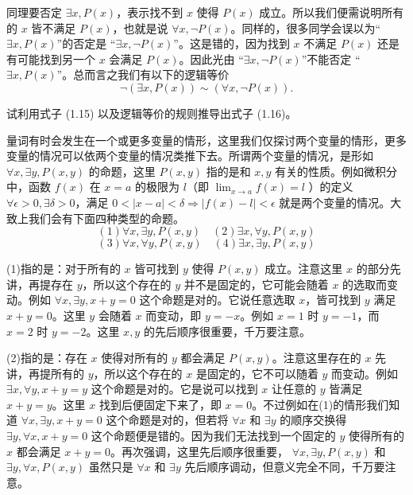 同理要否定 \(\exists x,P(x)\)，表示找不到 \(x\) 使得 \(P(x)\) 成立。所以我们便需说明所有的 \(x\) 皆不满足 \(P(x)\)，也就是说 \(\forall x,\neg P(x)\)。同样的，很多同学会误以为“ \(\exists x,P(x)\)”的否定是 “\(\exists x,\neg P(x)\)”。这是错的，因为找到 \(x\) 不满足 \(P(x)\) 还是有可能找到另一个 \(x\) 会满足 \(P(x)\)。因此光由 “\(\exists x,\neg P(x)\)”不能否定 “\(\exists x,P(x)\)”。总而言之我们有以下的逻辑等价
\[
\neg(\exists x,P(x)) \sim (\forall x,\neg P(x)). \tag{1.16}
\]

\begin{question}
试利用式子 (1.15) 以及逻辑等价的规则推导出式子 (1.16)。
\end{question}

量词有时会发生在一个或更多变量的情形，这里我们仅探讨两个变量的情形，更多变量的情况可以依两个变量的情况类推下去。所谓两个变量的情况，是形如 \(\forall x,\exists y,P(x,y)\) 的命题，这里 \(P(x,y)\) 指的是和 \(x,y\) 有关的性质。例如微积分中，函数 \(f(x)\) 在 \(x = a\) 的极限为 \(l\)（即 \(\lim_{x\to a}f(x) = l\) ）的定义 \(\forall \epsilon >0,\exists \delta >0\)，满足 \(0< |x - a|< \delta \Rightarrow |f(x) - l|< \epsilon\) 就是两个变量的情况。大致上我们会有下面四种类型的命题。
\[
(1)\forall x,\exists y,P(x,y)\quad (2)\exists x,\forall y,P(x,y)
\]
\[(3)\forall x,\forall y,P(x,y)\quad (4)\exists x,\exists y,P(x,y)\]

(1)指的是：对于所有的 \(x\) 皆可找到 \(y\) 使得 \(P(x,y)\) 成立。注意这里 \(x\) 的部分先讲，再提存在 \(y\)，所以这个存在的 \(y\) 并不是固定的，它可能会随着 \(x\) 的选取而变动。例如 \(\forall x,\exists y,x + y = 0\) 这个命题是对的。它说任意选取 \(x\)，皆可找到 \(y\) 满足 \(x + y = 0\)。这里 \(y\) 会随着 \(x\) 而变动，即 \(y = -x\)。例如 \(x = 1\) 时 \(y = -1\)，而 \(x = 2\) 时 \(y = -2\)。这里 \(x,y\) 的先后顺序很重要，千万要注意。

(2)指的是：存在 \(x\) 使得对所有的 \(y\) 都会满足 \(P(x,y)\)。注意这里存在的 \(x\) 先讲，再提所有的 \(y\)，所以这个存在的 \(x\) 是固定的，它不可以随着 \(y\) 而变动。例如 \(\exists x,\forall y,x + y = y\) 这个命题是对的。它是说可以找到 \(x\) 让任意的 \(y\) 皆满足 \(x + y = y\)。这里 \(x\) 找到后便固定下来了，即 \(x = 0\)。不过例如在(1)的情形我们知道 \(\forall x,\exists y,x + y = 0\) 这个命题是对的，但若将 \(\forall x\) 和 \(\exists y\) 的顺序交换得 \(\exists y,\forall x,x + y = 0\) 这个命题便是错的。因为我们无法找到一个固定的 \(y\) 使得所有的 \(x\) 都会满足 \(x + y = 0\)。再次强调，这里先后顺序很重要， \(\forall x,\exists y,P(x,y)\) 和 \(\exists y,\forall x,P(x,y)\) 虽然只是 \(\forall x\) 和 \(\exists y\) 先后顺序调动，但意义完全不同，千万要注意。

